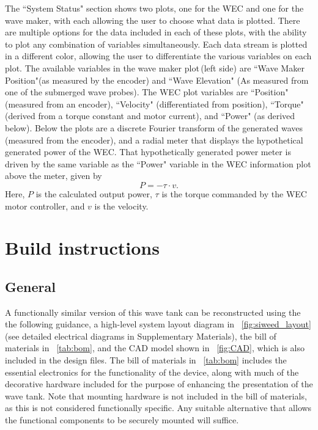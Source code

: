 \documentclass[hardware,article,submit,pdftex,moreauthors]{Definitions/mdpi}
\begin{document}
The ``System Status" section shows two plots, one for the WEC and one for the wave maker, with each allowing the user to choose what data is plotted. 
There are multiple options for the data included in each of these plots, with the ability to plot any combination of variables simultaneously.
Each data stream is plotted in a different color, allowing the user to differentiate the various variables on each plot.
The available variables in the wave maker plot\,(left side) are ``Wave Maker Position"(as measured by the encoder) and ``Wave Elevation" (As measured from one of the submerged wave probes).
The WEC plot variables are ``Position" (measured from an encoder), ``Velocity" (differentiated from position), ``Torque" (derived from a torque constant and motor current), and ``Power" (as derived below).
Below the plots are a discrete Fourier transform of the generated waves (measured from the encoder), and a radial meter that displays the hypothetical generated power of the WEC.
That hypothetically generated power meter is driven by the same variable as the ``Power" variable in the WEC information plot above the meter, given by
\begin{equation}
  P = -\tau \cdot v .
\end{equation}
Here, $P$ is the calculated output power, $\tau$ is the torque commanded by the WEC motor controller, and $v$ is the velocity.

\section{Build instructions}

\subsection{General}
A functionally similar version of this wave tank can be reconstructed using the the following guidance, a high-level system layout diagram in \figurename~\ref{fig:siweed_layout} (see detailed electrical diagrams in Supplementary Materials), the bill of materials in \tablename~\ref{tab:bom}, and the CAD model shown in \figurename~\ref{fig:CAD}, which is also included in the design files.
The bill of materials in \tablename~\ref{tab:bom} includes the essential electronics for the functionality of the device, along with much of the decorative hardware included for the purpose of enhancing the presentation of the wave tank.
Note that mounting hardware is not included in the bill of materials, as this is not considered functionally specific. 
Any suitable alternative that allows the functional components to be securely mounted will suffice.
\end{document}
